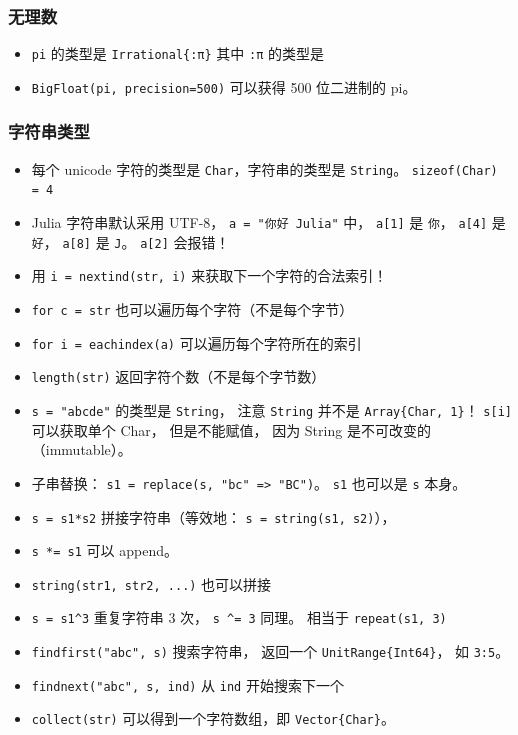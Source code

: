 \subsubsection{无理数}
\begin{itemize}
\item \verb`pi` 的类型是 \verb`Irrational{:π}` 其中 \verb`:π` 的类型是 
\item \verb`BigFloat(pi, precision=500)` 可以获得 500 位二进制的 pi。
\end{itemize}


\subsubsection{字符串类型}
\begin{itemize}
\item 每个 unicode 字符的类型是 \verb`Char`，字符串的类型是 \verb`String`。
\verb`sizeof(Char) = 4`
\item Julia 字符串默认采用 UTF-8， \verb`a = "你好 Julia"` 中， \verb`a[1]` 是 \verb`你`， \verb`a[4]` 是 \verb`好`， \verb`a[8]` 是 \verb`J`。 \verb`a[2]` 会报错！
\item 用 \verb`i = nextind(str, i)` 来获取下一个字符的合法索引！
\item \verb`for c = str` 也可以遍历每个字符（不是每个字节）
\item \verb`for i = eachindex(a)` 可以遍历每个字符所在的索引
\item \verb`length(str)` 返回字符个数（不是每个字节数）
\item \verb`s = "abcde"` 的类型是 \verb`String`， 注意 \verb`String` 并不是 \verb`Array{Char, 1}`！ \verb`s[i]` 可以获取单个 Char， 但是不能赋值， 因为 String 是不可改变的（immutable）。
\item 子串替换： \verb`s1 = replace(s, "bc" => "BC")`。 \verb`s1` 也可以是 \verb`s` 本身。
\item \verb`s = s1*s2` 拼接字符串（等效地： \verb`s = string(s1, s2)`）， \item \verb`s *= s1` 可以 append。
\item \verb`string(str1, str2, ...)` 也可以拼接
\item \verb`s = s1^3` 重复字符串 3 次， \verb`s ^= 3` 同理。 相当于 \verb`repeat(s1, 3)`
\item \verb`findfirst("abc", s)` 搜索字符串， 返回一个 \verb`UnitRange{Int64}`， 如 \verb`3:5`。
\item \verb`findnext("abc", s, ind)` 从 \verb`ind` 开始搜索下一个
\item \verb`collect(str)` 可以得到一个字符数组，即 \verb`Vector{Char}`。

\end{itemize}
